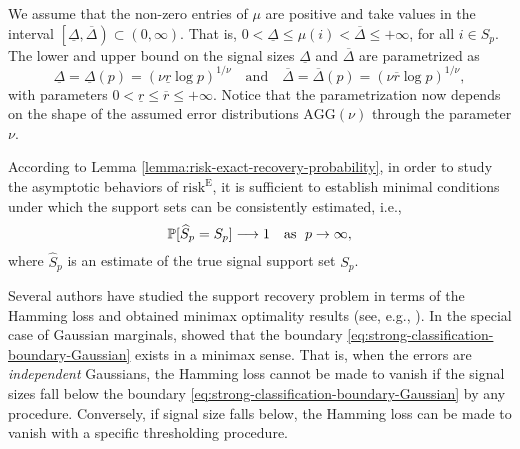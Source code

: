 We assume that the non-zero entries of $\mu$ are positive and take values in the interval $\left[\underline{\Delta},\overline{\Delta}\right)\subset (0,\infty)$.
That is, $0<\underline{\Delta}\le\mu(i)<\overline{\Delta}\le+\infty$, for all $i\in S_p$.
The lower and upper bound on the signal sizes $\underline{\Delta}$ and $\overline{\Delta}$ are parametrized as
\begin{equation} \label{eq:signal-size-parametrized}
    \underline{\Delta} = \underline{\Delta}(p) = (\nu \underline{r} \log{p})^{1/\nu} \quad \text{and} \quad
    \overline{\Delta} = \overline{\Delta}(p)  = (\nu \overline{r} \log{p})^{1/\nu},
\end{equation}
with parameters $0 < \underline{r} \le \overline{r} \le +\infty$.
Notice that the parametrization now depends on the shape of the assumed error distributions $\mathrm{AGG}(\nu)$ through the parameter $\nu$.

According to Lemma \ref{lemma:risk-exact-recovery-probability}, in order to study the asymptotic behaviors of $\mathrm{risk}^{\mathrm{E}}$, it is sufficient to establish minimal conditions under which the support sets can be consistently estimated, i.e.,
\begin{equation} \label{eq:exact-recovery} 
    \P[\widehat{S}_p = S_p] \longrightarrow 1 \quad \text{as } \; p\to\infty, 
\end{equation}
where $\widehat{S}_p$ is an estimate of the true signal support set $S_p$.

\medskip

Several authors have studied the support recovery problem in terms of the Hamming loss and obtained minimax optimality results (see, e.g., \cite{ji2012ups, genovese2012comparison, jin2014optimality, butucea2018variable}).
In the special case of Gaussian marginals, \cite{butucea2018variable} showed that the boundary \eqref{eq:strong-classification-boundary-Gaussian} exists in a minimax sense.
That is, when the errors are \emph{independent} Gaussians, the Hamming loss cannot be made to vanish if the signal sizes fall below the boundary \eqref{eq:strong-classification-boundary-Gaussian} by any procedure. 
Conversely, if signal size falls below, the Hamming loss can be made to vanish with a specific thresholding procedure.

